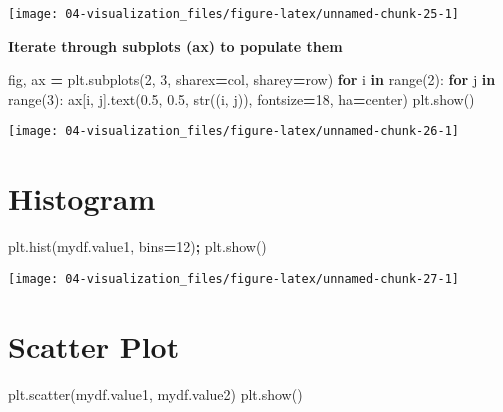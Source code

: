 \documentclass[
]{book}
\newenvironment{Shaded}{\begin{snugshade}}{\end{snugshade}}
\newcommand{\BuiltInTok}[1]{#1}
\newcommand{\ControlFlowTok}[1]{\textcolor[rgb]{0.27,0.27,0.27}{\textbf{#1}}}
\newcommand{\DecValTok}[1]{\textcolor[rgb]{0.06,0.06,0.06}{#1}}
\newcommand{\FloatTok}[1]{\textcolor[rgb]{0.06,0.06,0.06}{#1}}
\newcommand{\KeywordTok}[1]{\textcolor[rgb]{0.27,0.27,0.27}{\textbf{#1}}}
\newcommand{\NormalTok}[1]{#1}
\newcommand{\OperatorTok}[1]{\textcolor[rgb]{0.43,0.43,0.43}{\textbf{#1}}}
\newcommand{\StringTok}[1]{\textcolor[rgb]{0.5,0.5,0.5}{#1}}
\begin{document}
\texttt{[image: 04-visualization\_files/figure-latex/unnamed-chunk-25-1]}

\textbf{Iterate through subplots (ax) to populate them}

\begin{Shaded}
\begin{Highlighting}[]
\NormalTok{fig, ax }\OperatorTok{=}\NormalTok{ plt.subplots(}\DecValTok{2}\NormalTok{, }\DecValTok{3}\NormalTok{, sharex}\OperatorTok{=}\StringTok{\textquotesingle{}col\textquotesingle{}}\NormalTok{, sharey}\OperatorTok{=}\StringTok{\textquotesingle{}row\textquotesingle{}}\NormalTok{)}
\ControlFlowTok{for}\NormalTok{ i }\KeywordTok{in} \BuiltInTok{range}\NormalTok{(}\DecValTok{2}\NormalTok{):}
    \ControlFlowTok{for}\NormalTok{ j }\KeywordTok{in} \BuiltInTok{range}\NormalTok{(}\DecValTok{3}\NormalTok{):}
\NormalTok{        ax[i, j].text(}\FloatTok{0.5}\NormalTok{, }\FloatTok{0.5}\NormalTok{, }\BuiltInTok{str}\NormalTok{((i, j)),}
\NormalTok{                      fontsize}\OperatorTok{=}\DecValTok{18}\NormalTok{, ha}\OperatorTok{=}\StringTok{\textquotesingle{}center\textquotesingle{}}\NormalTok{)}
\NormalTok{plt.show()}
\end{Highlighting}
\end{Shaded}

\texttt{[image: 04-visualization\_files/figure-latex/unnamed-chunk-26-1]}

\hypertarget{histogram}{%
\section{Histogram}\label{histogram}}

\begin{Shaded}
\begin{Highlighting}[]
\NormalTok{plt.hist(mydf.value1, bins}\OperatorTok{=}\DecValTok{12}\NormalTok{)}\OperatorTok{;}
\NormalTok{plt.show()}
\end{Highlighting}
\end{Shaded}

\texttt{[image: 04-visualization\_files/figure-latex/unnamed-chunk-27-1]}

\hypertarget{scatter-plot}{%
\section{Scatter Plot}\label{scatter-plot}}

\begin{Shaded}
\begin{Highlighting}[]
\NormalTok{plt.scatter(mydf.value1, mydf.value2)}
\NormalTok{plt.show()}
\end{Highlighting}
\end{Shaded}
\end{document}
